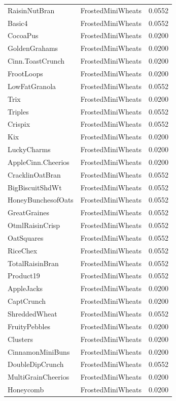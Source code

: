 \begin{longtable}{llr}
RaisinNutBran & FrostedMiniWheats & 0.0552 \\
Basic4 & FrostedMiniWheats & 0.0552 \\
CocoaPus & FrostedMiniWheats & 0.0200 \\
GoldenGrahams & FrostedMiniWheats & 0.0200 \\
Cinn.ToastCrunch & FrostedMiniWheats & 0.0200 \\
FrootLoops & FrostedMiniWheats & 0.0200 \\
LowFatGranola & FrostedMiniWheats & 0.0552 \\
Trix & FrostedMiniWheats & 0.0200 \\
Triples & FrostedMiniWheats & 0.0552 \\
Crispix & FrostedMiniWheats & 0.0552 \\
Kix & FrostedMiniWheats & 0.0200 \\
LuckyCharms & FrostedMiniWheats & 0.0200 \\
AppleCinn.Cheerios & FrostedMiniWheats & 0.0200 \\
CracklinOatBran & FrostedMiniWheats & 0.0552 \\
BigBiscuitShdWt & FrostedMiniWheats & 0.0552 \\
HoneyBunchesofOats & FrostedMiniWheats & 0.0552 \\
GreatGraines & FrostedMiniWheats & 0.0552 \\
OtmlRaisinCrisp & FrostedMiniWheats & 0.0552 \\
OatSquares & FrostedMiniWheats & 0.0552 \\
RiceChex & FrostedMiniWheats & 0.0552 \\
TotalRaisinBran & FrostedMiniWheats & 0.0552 \\
Product19 & FrostedMiniWheats & 0.0552 \\
AppleJacks & FrostedMiniWheats & 0.0200 \\
CaptCrunch & FrostedMiniWheats & 0.0200 \\
ShreddedWheat & FrostedMiniWheats & 0.0552 \\
FruityPebbles & FrostedMiniWheats & 0.0200 \\
Clusters & FrostedMiniWheats & 0.0200 \\
CinnamonMiniBuns & FrostedMiniWheats & 0.0200 \\
DoubleDipCrunch & FrostedMiniWheats & 0.0552 \\
MultiGrainCheerios & FrostedMiniWheats & 0.0200 \\
Honeycomb & FrostedMiniWheats & 0.0200 \\

\end{longtable}
